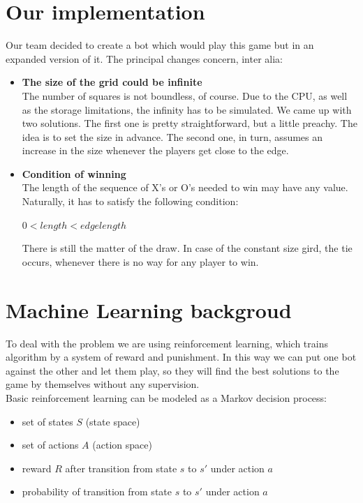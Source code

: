 \documentclass[a4paper,12pt]{book}
\begin{document}
	\section{Our implementation}
	Our team decided to create a bot which would play this game but in an expanded version of it. The principal changes concern, inter alia:\\
	\begin{itemize}
		\item \textbf{The size of the grid could be infinite}\\
		The number of squares is not boundless, of course. Due to the CPU, as well as the storage limitations, the infinity has to be simulated. We came up with two solutions. The first one is pretty straightforward, but a little preachy. The idea is to set the size in advance. The second one, in turn, assumes an increase in the size whenever the players get close to the edge.
		\item \textbf{Condition of winning}\\
		The length of the sequence of X's or O's needed to win may have any value. Naturally, it has to satisfy the following condition:
		\begin{center}
			$0 < length < edgelength$
		\end{center}
		There is still the matter of the draw. In case of the constant size gird, the tie occurs, whenever there is no way for any player to win.
	\end{itemize}
	\section{Machine Learning backgroud}
To deal with the problem we are using reinforcement learning, which trains algorithm by a system of reward and punishment. In this way we can put one bot against the other and let them play, so they will find the best solutions to the game by themselves without any supervision. 
\\Basic reinforcement learning can be modeled as a Markov decision process:
	\begin{itemize}
		\item set of states $S$ (state space)
		\item set of actions $A$ (action space)
		\item reward $R$ after transition from state $s$ to $s'$ under action $a$
		\item probability of transition from state $s$ to $s'$ under action $a$
	\end{itemize}
\pagebreak
\end{document}
